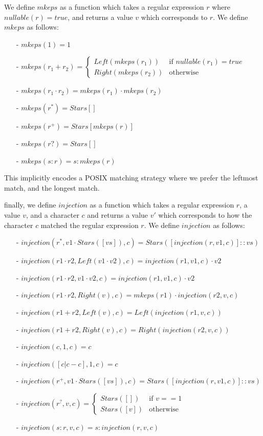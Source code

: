 We define $mkeps$ as a function which takes a regular expression $r$ where $nullable(r) = true$, and returns a value $v$ which corresponds to $r$.
We define $mkeps$ as follows:
\begin{enumerate}
    \item[-] $mkeps(1) = 1$
    \item[-] $mkeps(r_1 + r_2) = \begin{cases}
        Left(mkeps(r_1)) & \text{if } nullable(r_1) = true \\
        Right(mkeps(r_2)) & \text{otherwise}
    \end{cases}$
    \item[-] $mkeps(r_1 \cdot r_2) = mkeps(r_1) \cdot mkeps(r_2)$
    \item[-] $mkeps(r^*) = Stars[]$
    \item[-] $mkeps(r^+) = Stars[mkeps(r)]$
    \item[-] $mkeps(r?) = Stars[]$
    \item[-] $mkeps(s:r) = s:mkeps(r)$
\end{enumerate}
This implicitly encodes a POSIX matching strategy where we prefer the leftmost match, and the longest match.

finally, we define $injection$ as a function which takes a regular expression $r$, a value $v$, and a character $c$ and returns a value $v'$ which corresponds to how the character $c$ matched the regular expression $r$.
We define $injection$ as follows:
\begin{enumerate}
    \item[-] $injection(r^*, v1 \cdot Stars([vs]), c) = Stars([injection(r, v1, c)]::vs)$
    \item[-] $injection(r1 \cdot r2, Left(v1 \cdot v2), c) = injection(r1, v1, c) \cdot v2$
    \item[-] $injection(r1 \cdot r2, v1 \cdot v2, c) = injection(r1, v1, c) \cdot v2$
    \item[-] $injection(r1 \cdot r2, Right(v), c) = mkeps(r1) \cdot injection(r2, v, c)$
    \item[-] $injection(r1 + r2, Left(v), c) = Left(injection(r1, v, c))$
    \item[-] $injection(r1 + r2, Right(v), c) = Right(injection(r2, v, c))$
    \item[-] $injection(c, 1, c) = c$
    \item[-] $injection([c|c-c], 1, c) = c$
    \item[-] $injection(r^+, v1 \cdot Stars([vs]), c) = Stars([injection(r, v1, c)]::vs)$
    \item[-] $injection(r^?, v, c) = \begin{cases}
        Stars([]) & \text{if } v == 1 \\
        Stars([v]) & \text{otherwise}
    \end{cases}$
    \item[-] $injection(s:r, v, c) = s:injection(r, v, c)$
\end{enumerate}

